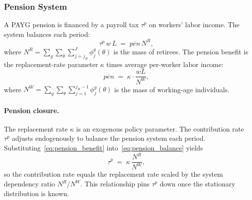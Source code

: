 \documentclass[12pt,a4paper]{article}
\begin{document}
\subsubsection{Pension System}
\label{subsubsec:pension}
A PAYG pension is financed by a payroll tax $\tau^p$ on workers' labor income. The system balances each period:
\begin{equation}
\label{eq:pension_balance}
\tau^p\, w\, L \;=\; \overline{pen}\, N^R,
\end{equation}
where $N^R = \sum_g \sum_\theta \sum_{j=j_R}^{J} \phi_j^{g}(\theta)$ is the mass of retirees. The pension benefit is the replacement-rate parameter $\kappa$ times average per-worker labor income:
\begin{equation}
\label{eq:pension_benefit}
\overline{pen} \;=\; \kappa \cdot \frac{w L}{N^W},
\end{equation}
where $N^W = \sum_g \sum_\theta \sum_{j=1}^{j_R - 1} \phi_j^{g}(\theta)$ is the mass of working-age individuals.

\paragraph{Pension closure.}
The replacement rate $\kappa$ is an exogenous policy parameter. The contribution rate $\tau^p$ adjusts endogenously to balance the pension system each period. Substituting~\eqref{eq:pension_benefit} into~\eqref{eq:pension_balance} yields
\begin{equation}
\label{eq:pension_contribution}
\tau^p \;=\; \kappa\, \frac{N^R}{N^W},
\end{equation}
so the contribution rate equals the replacement rate scaled by the system dependency ratio $N^R / N^W$. This relationship pins $\tau^p$ down once the stationary distribution is known.
\end{document}
